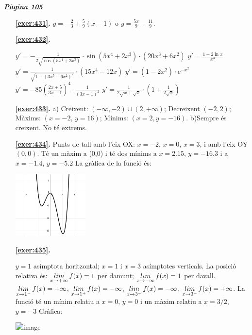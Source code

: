 
\hyperlink{page.105}{\textbf{\em Pàgina 105}}
\begin{enumerate}
\item[\fontfamily{phv}\selectfont\color{blue}\textbf{\ref{exer:431}. }] \label{ans:431} 
$y=-\frac {2}{3}+\frac {5}{9}(x-1)$ o $y=\frac {5x}{9}-\frac {11}{9}$.
 \end{enumerate}
\begin{enumerate}
\item[\fontfamily{phv}\selectfont\color{blue}\textbf{\ref{exer:432}. }] \label{ans:432} 
\begin{tasks} \task $y'=-\frac {1}{2\sqrt {\cos (5x^4+2x^3)}}\cdot \sin (5x^4+2x^3) \cdot (20x^3+6x^2)$ \task $y'=\frac {1-2\ln x}{x^3}$ \task $y'=\frac {1}{\sqrt {1-(3x^5-6x^2)^2}}\cdot (15x^4-12x)$ \task $y'=(1-2x^2)\cdot e^{-x^2}$ \task $y'=-85\left ( \frac {2x+5}{3x-1} \right )^4 \cdot \frac {1}{(3x-1)^2}$ \task $y'=\frac {1}{2\sqrt {x+\sqrt {x}}}\cdot (1+\frac {1}{2\sqrt {x}})$ \end{tasks}
\item[\fontfamily{phv}\selectfont\color{blue}\textbf{\ref{exer:433}. }] \label{ans:433} 
a) Creixent: $(-\infty , -2)\cup (2,+\infty )$; Decreixent $(-2,2)$; Màxims: $(x=-2,\, y=16)$; Mínims: $(x=2, y=-16)$. b)Sempre és creixent. No té extrems.
\item[\fontfamily{phv}\selectfont\color{blue}\textbf{\ref{exer:434}. }] \label{ans:434} 
Punts de tall amb l'eix OX: $x=-2$, $x=0$, $x=3$, i amb l'eix OY $(0,0)$. Té un màxim a (0,0) i té dos mínims a $x=2.15$, $y=-16.3$ i a $x=-1.4$, $y=-5.2$ La gràfica de la funció és: \par \includegraphics [width=0.3\textwidth ]{img-07-bloc2/sol-bloc2-polinomi1.png} 
\item[\fontfamily{phv}\selectfont\color{blue}\textbf{\ref{exer:435}. }] \label{ans:435} 
\begin{tasks} \task $y=1$ asímptota horitzontal; $x=1$ i $x=3$ asímptotes verticals. La posició relativa és: $\mathop{lim}\limits_{x\to +\infty } f(x)=1$ per damunt; $\mathop{lim}\limits_{x\to -\infty } f(x)=1$ per davall. $\mathop{lim}\limits_{x\to 1^-} f(x)=+\infty $, $\mathop{lim}\limits_{x\to 1^+} f(x)=-\infty $, $\mathop{lim}\limits_{x\to 3^-} f(x)=-\infty $, $\mathop{lim}\limits_{x\to 3^+} f(x)=+\infty $. \task La funció té un mínim relatiu a $x=0$, $y=0$ i un màxim relatiu a $x=3/2$, $y=-3$ \task Gràfica: \par \includegraphics *[width=0.35\textwidth ]{img-07-bloc2/bloc2-10.png} \end{tasks}

\end{enumerate}
